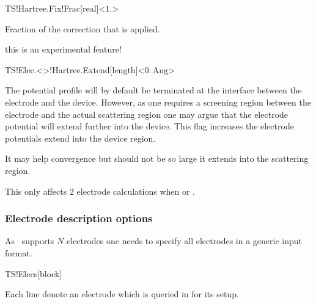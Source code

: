 \begin{fdfentry}{TS!Hartree.Fix!Frac}[real]<$1.$>

  Fraction of the correction that is applied.

  \note this is an experimental feature!

\end{fdfentry}

\begin{fdfentry}{TS!Elec.<>!Hartree.Extend}[length]<$0.\,\mathrm{Ang}$>

  The potential profile will by default be terminated at the interface
  between the electrode and the device. However, as one requires a
  screening region between the electrode and the actual scattering
  region one may argue that the electrode potential will extend
  further into the device.
  This flag increases the electrode potentials extend into the device
  region.

  It may help convergence but should not be so large it extends into
  the scattering region.

  \note This only affects $2$ electrode calculations when
   or .
  
\end{fdfentry}


\subsubsection{Electrode description options}

As \tsiesta\ supports $N$ electrodes one needs to specify all
electrodes in a generic input format.

\begin{fdfentry}{TS!Elecs}[block]

  Each line denote an electrode which is queried in 
  for its setup.
  
\end{fdfentry}

